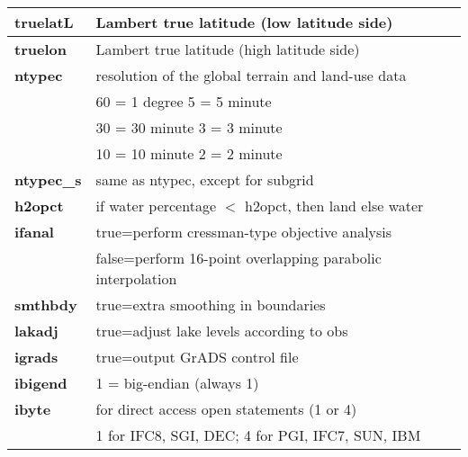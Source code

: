 \begin{table}[h]
\begin{center}
\begin{tabular}{|l|l|}
{\footnotesize {\bf truelatL}} &   {\footnotesize Lambert true latitude (low  latitude side)} \\  \hline
{\footnotesize {\bf truelon}} &   {\footnotesize Lambert true latitude (high latitude side)} \\  \hline
{\footnotesize {\bf ntypec}} & {\footnotesize resolution of the global terrain and land-use data} \\
 &  \vspace{-0.15 cm} \hspace{0.5 cm} {\footnotesize 60 = 1 degree \hspace{1.25cm} 5 = 5 minute} \\ 
 &  \vspace{-0.15 cm} \hspace{0.5 cm} {\footnotesize 30 = 30 minute \hspace{1.1cm} 3 = 3 minute} \\ 
 &  \hspace{0.5 cm} {\footnotesize 10 = 10 minute \hspace{1cm} 2 = 2 minute } \\ \hline
{\footnotesize {\bf ntypec\_s}} & {\footnotesize same as ntypec, except for subgrid} \\ \hline

{\footnotesize {\bf h2opct}}  & {\footnotesize if water percentage $<$ h2opct, then land else water} \\ \hline
{\footnotesize {\bf ifanal}}  & {\footnotesize  true=perform cressman-type objective analysis} \\  
 & {\footnotesize  false=perform 16-point overlapping parabolic interpolation} \\ \hline
{\footnotesize {\bf smthbdy}}  & {\footnotesize true=extra smoothing in boundaries} \\ \hline
{\footnotesize {\bf lakadj}}   & {\footnotesize true=adjust lake levels according to obs} \\ \hline
{\footnotesize {\bf igrads}}   & {\footnotesize true=output GrADS control file} \\ \hline
{\footnotesize {\bf ibigend}}  & {\footnotesize 1 = big-endian (always 1)} \\ \hline
{\footnotesize {\bf ibyte}}  & {\footnotesize for direct access open statements (1 or 4)} \\  
 & {\footnotesize  1 for IFC8, SGI, DEC;  4 for PGI, IFC7, SUN, IBM} \\ \hline


\end{tabular}
\end{center}
\end{table}
